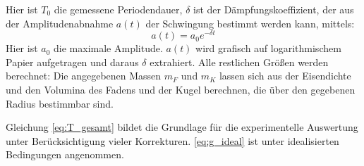 Hier ist \(T_0\) die gemessene Periodendauer, \(\delta\) ist der Dämpfungskoeffizient, der aus der Amplitudenabnahme \(a(t)\) der Schwingung bestimmt werden kann, mittels:
\begin{equation}
    a(t)=a_0e^{-\delta t}
    \label{eq:Amplitudenabnahme}
\end{equation} 
Hier ist \(a_0\) die maximale Amplitude. \(a(t)\) wird grafisch auf logarithmischem Papier aufgetragen und daraus \(\delta\) extrahiert.
Alle restlichen Größen werden berechnet: Die angegebenen Massen \(m_F\) und \(m_K\) lassen sich aus der Eisendichte und den Volumina des Fadens und der Kugel berechnen, die über den gegebenen Radius bestimmbar sind.

Gleichung \cref{eq:T_gesamt} bildet die Grundlage für die experimentelle Auswertung unter Berücksichtigung vieler Korrekturen. \cref{eq:g_ideal} ist unter idealisierten Bedingungen angenommen.
